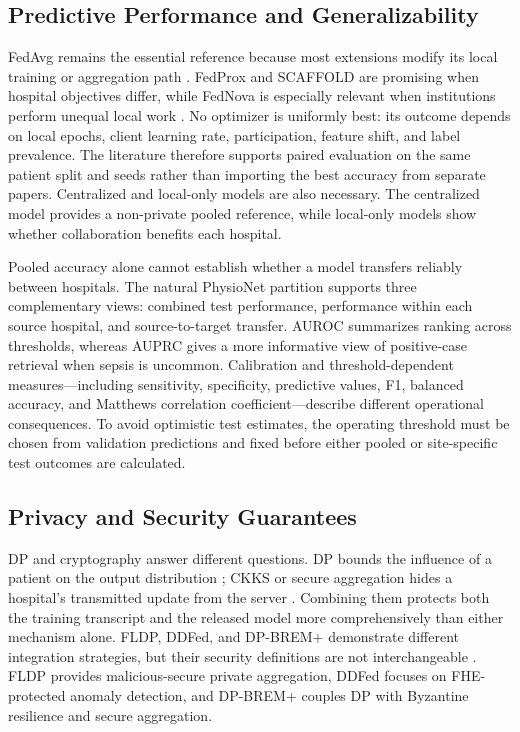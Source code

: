 \subsection{Predictive Performance and Generalizability}

FedAvg remains the essential reference because most extensions modify its local training or aggregation path \cite{mcmahan2017fedavg}. FedProx and SCAFFOLD are promising when hospital objectives differ, while FedNova is especially relevant when institutions perform unequal local work \cite{li2020fedprox,karimireddy2020scaffold,wang2020fednova}. No optimizer is uniformly best: its outcome depends on local epochs, client learning rate, participation, feature shift, and label prevalence. The literature therefore supports paired evaluation on the same patient split and seeds rather than importing the best accuracy from separate papers. Centralized and local-only models are also necessary. The centralized model provides a non-private pooled reference, while local-only models show whether collaboration benefits each hospital.

Pooled accuracy alone cannot establish whether a model transfers reliably between hospitals. The natural PhysioNet partition supports three complementary views: combined test performance, performance within each source hospital, and source-to-target transfer. AUROC summarizes ranking across thresholds, whereas AUPRC gives a more informative view of positive-case retrieval when sepsis is uncommon. Calibration and threshold-dependent measures---including sensitivity, specificity, predictive values, F1, balanced accuracy, and Matthews correlation coefficient---describe different operational consequences. To avoid optimistic test estimates, the operating threshold must be chosen from validation predictions and fixed before either pooled or site-specific test outcomes are calculated.

\subsection{Privacy and Security Guarantees}

DP and cryptography answer different questions. DP bounds the influence of a patient on the output distribution \cite{dwork2006calibrating,abadi2016deep}; CKKS or secure aggregation hides a hospital's transmitted update from the server \cite{cheon2017homomorphic,bonawitz2017practical}. Combining them protects both the training transcript and the released model more comprehensively than either mechanism alone. FLDP, DDFed, and DP-BREM+ demonstrate different integration strategies, but their security definitions are not interchangeable \cite{stevens2022fldp,xu2024ddfed,gu2025dpbrem}. FLDP provides malicious-secure private aggregation, DDFed focuses on FHE-protected anomaly detection, and DP-BREM+ couples DP with Byzantine resilience and secure aggregation.

